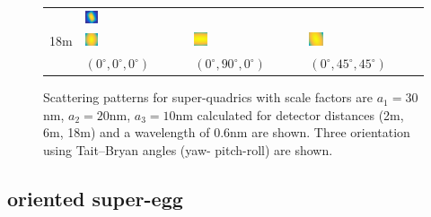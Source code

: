 \begin{figure}[thb]
{\begin{tabular}{llll}
     & \includegraphics[width=0.13\textwidth]{../images/form_factor/supershapes/superquadrics_2_5_0_45_45_6m.png}  \\
18m  & \includegraphics[width=0.13\textwidth]{../images/form_factor/supershapes/superquadrics_2_5_0_0_0_18m.png}
     & \includegraphics[width=0.13\textwidth]{../images/form_factor/supershapes/superquadrics_2_5_0_90_0_18m.png}
     & \includegraphics[width=0.13\textwidth]{../images/form_factor/supershapes/superquadrics_2_5_0_45_45_18m.png}  \\
     & {\small $(0^\circ,0^\circ,0^\circ)$}
     & {\small $(0^\circ,90^\circ,0^\circ)$}
     & {\small $(0^\circ,45^\circ,45^\circ)$}  %
\end{tabular}
}
\endgroup
  \caption{Scattering patterns for super-quadrics with scale factors are $a_1=30$nm, $a_2=20$nm, $a_3=10$nm calculated for detector distances (2m, 6m, 18m) and a wavelength of 0.6nm are shown. Three orientation using Tait–Bryan angles (yaw-
pitch-roll) are shown.} \label{fig:superquadricsIQ2D}
\end{figure}

\clearpage
\subsection{oriented super-egg} ~\\

